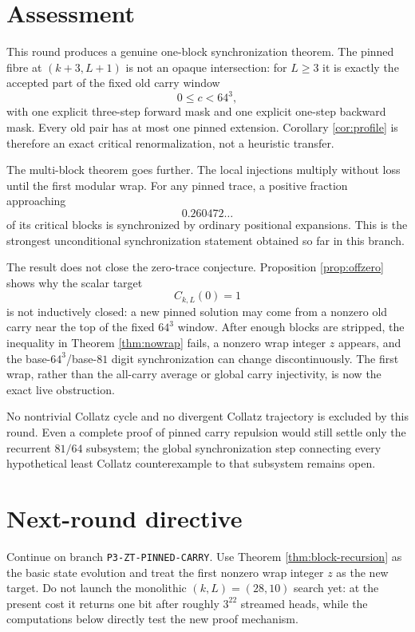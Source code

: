 \documentclass[11pt]{article}
\theoremstyle{remark}
\begin{document}
\section{Assessment}

This round produces a genuine one-block synchronization theorem.  The pinned fibre at $(k+3,L+1)$ is not an opaque intersection: for $L\ge3$ it is exactly the accepted part of the fixed old carry window
\[
0\le c<64^3,
\]
with one explicit three-step forward mask and one explicit one-step backward mask.  Every old pair has at most one pinned extension.  Corollary \ref{cor:profile} is therefore an exact critical renormalization, not a heuristic transfer.

The multi-block theorem goes further.  The local injections multiply without loss until the first modular wrap.  For any pinned trace, a positive fraction approaching
\[
0.260472\ldots
\]
of its critical blocks is synchronized by ordinary positional expansions.  This is the strongest unconditional synchronization statement obtained so far in this branch.

The result does not close the zero-trace conjecture.  Proposition \ref{prop:offzero} shows why the scalar target
\[
C_{k,L}(0)=1
\]
is not inductively closed: a new pinned solution may come from a nonzero old carry near the top of the fixed $64^3$ window.  After enough blocks are stripped, the inequality in Theorem \ref{thm:nowrap} fails, a nonzero wrap integer $z$ appears, and the base-$64^3$/base-$81$ digit synchronization can change discontinuously.  The first wrap, rather than the all-carry average or global carry injectivity, is now the exact live obstruction.

No nontrivial Collatz cycle and no divergent Collatz trajectory is excluded by this round.  Even a complete proof of pinned carry repulsion would still settle only the recurrent $81/64$ subsystem; the global synchronization step connecting every hypothetical least Collatz counterexample to that subsystem remains open.

\section{Next-round directive}

Continue on branch \texttt{P3-ZT-PINNED-CARRY}.  Use Theorem \ref{thm:block-recursion} as the basic state evolution and treat the first nonzero wrap integer $z$ as the new target.  Do not launch the monolithic $(k,L)=(28,10)$ search yet: at the present cost it returns one bit after roughly $3^{22}$ streamed heads, while the computations below directly test the new proof mechanism.
\end{document}
